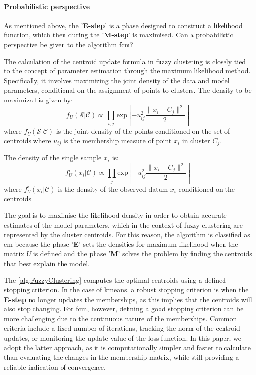 \paragraph{Probabilistic perspective}
As mentioned above, the '\textbf{E-step}' is a phase designed to construct a likelihood function, which then during the '\textbf{M-step}' is maximised. Can a probabilistic perspective be given to the algorithm \gls{fcm}?

\noindent The calculation of the centroid update formula in fuzzy clustering is closely tied to the concept of parameter estimation through the maximum likelihood method. Specifically, it involves maximizing the joint density of the data and model parameters, conditional on the assignment of points to clusters.
The density to be maximized is given by:
\begin{equation*}
 f_U(\mathcal{S}|\mathcal{C}) \propto \prod_{i,j}\text{exp}\left[-u_{ij}^2\frac{\|x_i-C_j\|^2}{2}\right]
\end{equation*}
where $f_U(\mathcal{S}|\mathcal{C})$ is the joint density of the points conditioned on the set of centroids where $u_{ij}$ is the membership measure of point $x_i$ in cluster $C_j$.

\noindent The density of the single sample $x_i$ is:
\begin{equation*}
 f_U^i(x_i|\mathcal{C}) \propto \prod_{j}\text{exp}\left[-u_{ij}^2\frac{\|x_i-C_j\|^2}{2}\right]
\end{equation*}
where $f_U^i(x_i|\mathcal{C})$ is the density of the observed datum $x_i$ conditioned on the centroids.

\noindent The goal is to maximise the likelihood density in order to obtain accurate estimates of the model parameters, which in the context of fuzzy clustering are represented by the cluster centroids. For this reason, the algorithm is classified as \gls{em} because the phase '\textbf{E}' sets the densities for maximum likelihood when the matrix $U$ is defined and the phase '\textbf{M}' solves the problem by finding the centroids that best explain the model.

\noindent The \cref{alg:FuzzyClustering} computes the optimal centroids using a defined stopping criterion. In the case of \gls{kmeans}, a robust stopping criterion is when the \textbf{E-step} no longer updates the memberships, as this implies that the centroids will also stop changing. For \gls{fcm}, however, defining a good stopping criterion can be more challenging due to the continuous nature of the memberships. Common criteria include a fixed number of iterations, tracking the norm of the centroid updates, or monitoring the update value of the loss function. In this paper, we adopt the latter approach, as it is computationally simpler and faster to calculate than evaluating the changes in the membership matrix, while still providing a reliable indication of convergence.

